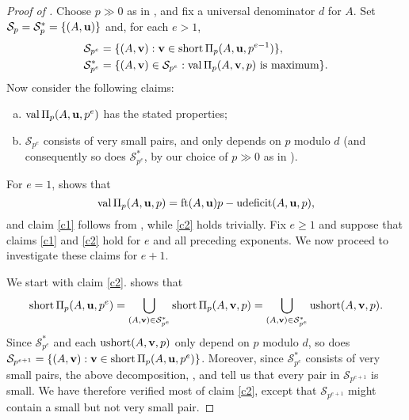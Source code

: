 \documentclass[11pt]{amsart}
\newcommand{\short}{\operatorname{short}}
\newcommand{\ushort}{\operatorname{ushort}}
\newcommand{\udeficit}{\operatorname{udeficit}}
\newcommand{\denom}{d}
\renewcommand{\S}{\mathcal{S}}
\begin{document}
\begin{proof}[Proof of ]
   Choose $p \gg 0$ as in , and fix a universal denominator $\denom$ for $A$.
   Set $\S_p = \S^*_p = \{ (A,\vv{u}) \}$ and, for each $e > 1$,
   \begin{align*}
   \S_{p^{e}} &= \{ (A,\vv{v}):  \vv{v} \in \short \IP_p(A,\vv{u},p^{e-1}) \},\\
   \S^*_{p^{e}} &= \{ (A,\vv{v}) \in \S_{p^{e}}:  \val\IP_p(A,\vv{v},p)\text{ is maximum} \}.
   \end{align*}
   Now consider the following claims:
   \begin{enumerate}[(a),leftmargin=*]
      \item\label{c1} $\operatorname{val} \Pi_p(A,\mathbf{u},p^e)$ has the stated properties;
      \item\label{c2} $\S_{p^e}$ consists of very small pairs, and only depends on $p$ modulo $\denom$ (and consequently so does $\S^*_{p^e}$, by our choice of $p\gg 0$ as in ).
   \end{enumerate}
   For $e=1$,  shows that
   \[ \val \IP_p(A,\vv{u},p) = \ft{A}{\vv{u}}p-\udeficit(A,\vv{u},p),\]
   and claim \ref{c1} follows from , while \ref{c2} holds trivially.
   Fix $e\ge 1$ and suppose that claims \ref{c1} and \ref{c2} hold for $e$ and all preceding exponents.
   We now proceed to investigate these claims for $e+1$.

   We start with claim \ref{c2}.
    shows that 
   \[\short \IP_p(A,\vv{u},p^{e}) = \bigcup_{(A,\vv{v}) \in \S^*_{p^e}} \short \IP_p(A,\vv{v}, p)
      = \bigcup_{(A,\vv{v}) \in \S^*_{p^e}} \ushort(A,\vv{v}, p).\]
   Since $\S^*_{p^e}$ and each $\ushort(A,\vv{v}, p)$ only depend on $p$ modulo $\denom$, so does $\S_{p^{e+1}} = \{(A,\vv{v}): \vv{v}\in \short \IP_p(A,\vv{u},p^{e})\}$.
   Moreover, since $\S^*_{p^e}$ consists of very small pairs, the above decomposition, , and  tell us that every pair in $\S_{p^{e+1}}$ is small.
   We have therefore verified most of claim \ref{c2}, except that $\S_{p^{e+1}}$ might contain a small but not very small pair.
 

\end{proof}
\end{document}
